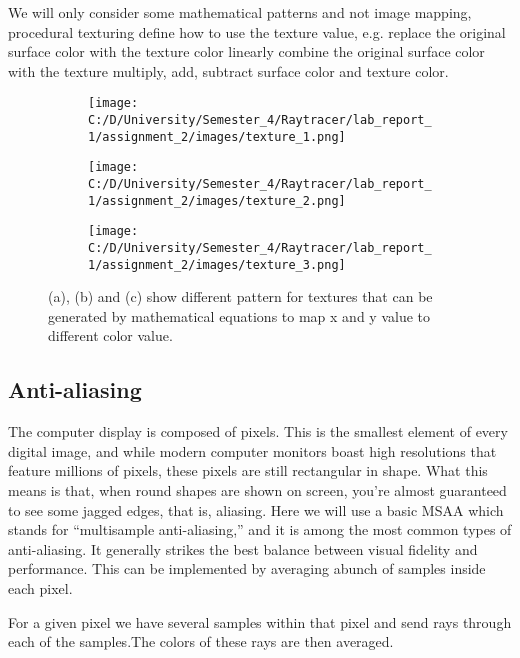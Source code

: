 \documentclass{article}
\begin{document}
We will only consider some mathematical patterns and not image mapping, procedural texturing
define how to use the texture value, e.g. replace the original surface color with the texture color
linearly combine the original surface color with the texture
multiply, add, subtract surface color and texture color.


\begin{figure}[ht]
	\begin{subfigure}{.3\textwidth}
		\centering
		\texttt{[image: C:/D/University/Semester\_4/Raytracer/lab\_report\_1/assignment\_2/images/texture\_1.png]}  
		\caption{}
		\label{fig:sub-first}
	\end{subfigure}
	\begin{subfigure}{.3\textwidth}
		\centering
		\texttt{[image: C:/D/University/Semester\_4/Raytracer/lab\_report\_1/assignment\_2/images/texture\_2.png]}  
		\caption{}
		\label{fig:sub-second}
	\end{subfigure}
	\begin{subfigure}{.3\textwidth}
		\centering
		\texttt{[image: C:/D/University/Semester\_4/Raytracer/lab\_report\_1/assignment\_2/images/texture\_3.png]}  
		\caption{}
		\label{fig:sub-third}
	\end{subfigure}
	
	\caption{(a), (b) and (c) show different pattern for textures that can be generated by mathematical equations to map x and y value to different color value.}
	\label{fig:fig}
\end{figure}


\subsection{Anti-aliasing}
The computer display is composed of pixels. This is the smallest element of every digital image, and while modern computer monitors boast high resolutions that feature millions of pixels, these pixels are still rectangular in shape. What this means is that, when round shapes are shown on screen, you’re almost guaranteed to see some jagged edges, that is, aliasing.
Here we will use a basic MSAA which stands for “multisample anti-aliasing,” and it is among the most common types of anti-aliasing. It generally strikes the best balance between visual fidelity and performance. This can be implemented by averaging abunch of samples inside each pixel.

For a given pixel we have several samples within that pixel and send rays through each of the samples.The colors of these rays are then averaged.
\end{document}
